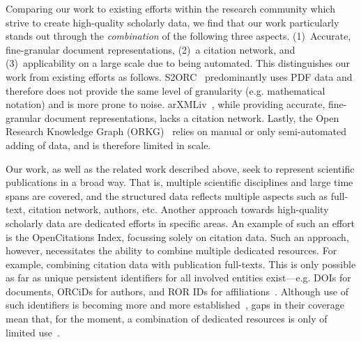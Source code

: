Comparing our work to existing efforts within the research community which strive to create high-quality scholarly data, we find that our work particularly stands out through the \emph{combination} of the following three aspects. (1)~Accurate, fine-granular document representations, (2)~a citation network, and (3)~applicability on a large scale due to being automated. This distinguishes our work from existing efforts as follows. S2ORC~\cite{Lo2020} predominantly uses PDF data and therefore does not provide the same level of granularity (e.g. mathematical notation) and is more prone to noise. arXMLiv~\cite{arXMLiv}, while providing accurate, fine-granular document representations, lacks a citation network. Lastly, the Open Research Knowledge Graph (ORKG)~\cite{orkg1,orkg2} relies on manual or only semi-automated adding of data, and is therefore limited in scale.



Our work, as well as the related work described above, seek to represent scientific publications in a broad way.
That is, multiple scientific disciplines and large time spans are covered, and the structured data reflects multiple aspects such as full-text, citation network, authors, etc. Another approach towards high-quality scholarly data are dedicated efforts in specific areas. An example of such an effort is the OpenCitations Index, focussing solely on citation data. Such an approach, however, necessitates the ability to combine multiple dedicated resources. For example, combining citation data with publication full-texts. This is only possible as far as unique persistent identifiers for all involved entities exist---e.g. DOIs for documents, ORCiDs for authors, and ROR IDs for affiliations~\cite{Meadows2019}. Although use of such identifiers is becoming more and more established~\cite{Gorraiz2016}, 
gaps in their coverage mean that, for the moment, a combination of dedicated resources is only of limited use~\cite{Youtie2017,Haak2018}.

